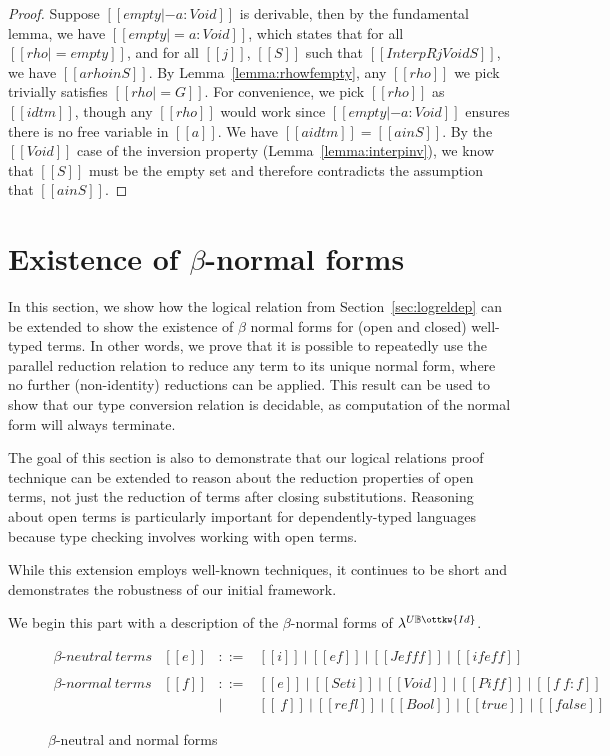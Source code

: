 \documentclass[acmsmall,screen=true,
\ifpublic review=false\else,review=true\fi
  ,anonymous=\ifanonymous true\else false\fi]{acmart}
\newcommand{\lang}{$\lambda^{U\mathbb{B}\ottkw{Id}}$\xspace}
\newcommand{\scw}[1]{}
\begin{document}
\begin{proof}
  Suppose $[[empty |- a : Void]]$ is derivable, then by the
  fundamental lemma, we have $[[empty |= a : Void]]$, which states
  that for all $[[rho |= empty]]$, and for all $[[j]]$, $[[S]]$ such
  that $[[InterpR j Void S]]$, we have $[[a {rho} in S]]$. By
  Lemma~\ref{lemma:rhowfempty}, any $[[rho]]$ we pick trivially
  satisfies $[[rho |= G]]$. For convenience, we pick $[[rho]]$ as
  $[[idtm]]$, though any $[[rho]]$ would work since
  $[[empty |- a : Void]]$ ensures there is no free variable in
  $[[a]]$. We have $[[a {idtm}]] = [[a in S]]$. By the $[[Void]]$
  case of the inversion property (Lemma~\ref{lemma:interpinv}), we
  know that $[[S]]$ must be the empty set and therefore contradicts
  the assumption that $[[a in S]]$.
\end{proof}


\section{Existence of $\beta$-normal forms}
\label{sec:extension}
In this section, we show how the logical relation from
Section~\ref{sec:logreldep} can be extended to show the existence of $\beta$
normal forms for (open and closed) well-typed terms.  In other words, we prove
that it is possible to repeatedly use the parallel reduction relation to
reduce any term to its unique normal form, where no further (non-identity)
reductions can be applied. This result can be used to show that our type
conversion relation is decidable, as computation of the normal form will
always terminate.

The goal of this section is also to demonstrate that our logical relations
proof technique can be extended to reason about the reduction properties of
open terms, not just the reduction of terms after closing substitutions.
Reasoning about open terms is particularly important for dependently-typed
languages because type checking involves working with open terms.
\scw{
  Add when we can find a reference:
  However, even non dependently-typed languages employ such techniques,
  especially in the case of relational semantics.
}
While this extension employs well-known techniques, it continues to be short and
demonstrates the robustness of our initial framework.

We begin this part with a description of the $\beta$-normal forms
of \lang{}.

\begin{figure}[h]
  \[
    \begin{array}{llcl}
       \beta\text{-}\mathit{neutral\ terms} &
      [[e]] & ::= & [[i]]\ |\ [[e f]]\ |\ [[J e f f f]]\ |\ [[if e f
                    f]] \\ \\
      \beta\text{-}\mathit{normal\ terms} &
      [[f]] & ::= & [[e]]\ |\ [[Set i]]\ |\ [[Void]]\ |\ [[Pi f f]]\
                    |\ [[f ~ f : f]]\\
            & & |   & [[\ f]]\ |\ [[refl]]\ |\ [[Bool]]\ |\ [[true]]\ |\ [[false]]
    \end{array}
  \]
  \caption{$\beta$-neutral and normal forms}
  \label{fig:nenf}
\end{figure}
\end{document}
